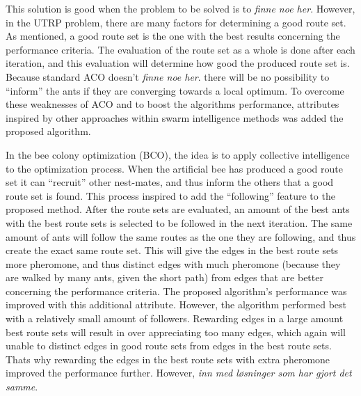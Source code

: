 This solution is good when the problem to be solved is to \emph{\color{blue} finne noe her}. However, in the UTRP problem, there are many factors for determining a good route set. As mentioned, a good route set is the one with the best results concerning the performance criteria. The evaluation of the route set as a whole is done after each iteration, and this evaluation will determine how good the produced route set is. Because standard ACO doesn't \emph{\color{blue} finne noe her}. there will be no possibility to ``inform'' the ants if they are converging towards a local optimum. To overcome these weaknesses of ACO and to boost the algorithms performance, attributes inspired by other approaches within swarm intelligence methods was added the proposed algorithm. 

In the bee colony optimization (BCO), the idea is to apply collective intelligence to the optimization process. When the artificial bee has produced a good route set it can ``recruit'' other nest-mates, and thus inform the others that a good route set is found. This process inspired to add the ``following'' feature to the proposed method. After the route sets are evaluated, an amount of the best ants with the best route sets is selected to be followed in the next iteration. The same amount of ants will follow the same routes as the one they are following, and thus create the exact same route set. This will give the edges in the best route sets more pheromone, and thus distinct edges with much pheromone (because they are walked by many ants, given the short path) from edges that are better concerning the performance criteria. The proposed algorithm's performance was improved with this additional attribute. However, the algorithm performed best with a relatively small amount of followers. Rewarding edges in a large amount best route sets will result in over appreciating too many edges, which again will unable to distinct edges in good route sets from edges in the best route sets. Thats why rewarding the edges in the best route sets with extra pheromone improved the performance further. However, \emph{\color{blue} inn med løsninger som har gjort det samme}.


